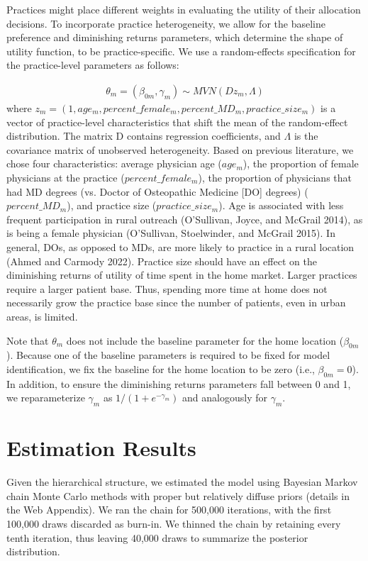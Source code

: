 \documentclass{article}
\begin{document}
Practices might place different weights in evaluating the utility of their allocation decisions. To incorporate practice heterogeneity, we allow for the baseline preference and diminishing returns parameters, which determine the shape of utility function, to be practice-specific. We use a random-effects specification for the practice-level parameters as follows:

\begin{align} \label{eq:2}
\theta_m = (\beta_{0m}, \gamma_m) \sim MVN(D z_m, \Lambda)
\end{align}
where
$z_m = (1, age_m, percent\_female_m, percent\_MD_m, practice\_size_m)$ is a vector of practice-level characteristics that shift the mean of the random-effect distribution. The matrix D contains regression coefficients, and $\Lambda$ is the covariance matrix of unobserved heterogeneity. Based on previous literature, we chose four characteristics: average physician age ($age_m$), the proportion of female physicians at the practice ($percent\_female_m$), the proportion of physicians that had MD degrees (vs. Doctor of Osteopathic Medicine [DO] degrees) ($percent\_MD_m$), and practice size ($practice\_size_m$). Age is associated with less frequent participation in rural outreach (O'Sullivan, Joyce, and McGrail 2014), as is being a female physician (O'Sullivan, Stoelwinder, and McGrail 2015). In general, DOs, as opposed to MDs, are more likely to practice in a rural location (Ahmed and Carmody 2022). Practice size should have an effect on the diminishing returns of utility of time spent in the home market. Larger practices require a larger patient base. Thus, spending more time at home does not necessarily grow the practice base since the number of patients, even in urban areas, is limited.

Note that $\theta_m$ does not include the baseline parameter for the home location ($\beta_{0m}$). Because one of the baseline parameters is required to be fixed for model identification, we fix the baseline for the home location to be zero (i.e., $\beta_{0m} = 0$). In addition, to ensure the diminishing returns parameters fall between 0 and 1, we reparameterize $\gamma_m$ as $1/(1 + e^{-\gamma_m})$ and analogously for $\gamma_m$.

\section*{Estimation Results}

Given the hierarchical structure, we estimated the model using Bayesian Markov chain Monte Carlo methods with proper but relatively diffuse priors (details in the Web Appendix). We ran the chain for 500,000 iterations, with the first 100,000 draws discarded as burn-in. We thinned the chain by retaining every tenth iteration, thus leaving 40,000 draws to summarize the posterior distribution.
\end{document}
